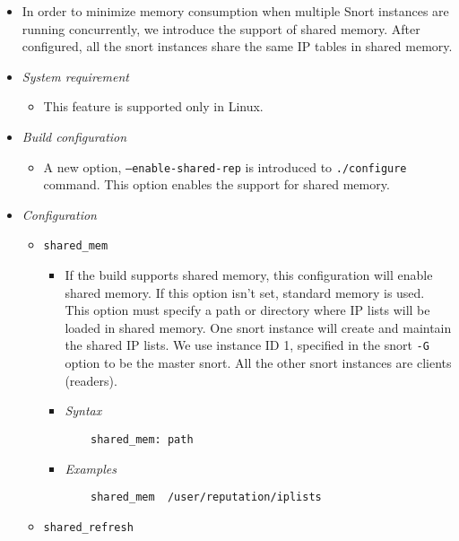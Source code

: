 \documentclass[english]{report}
\begin{document}
\begin{itemize}
 \item[]
  In order to minimize memory consumption when multiple Snort instances are 
  running concurrently, we introduce the support of shared memory. After 
  configured, all the snort instances share the same IP tables in shared memory. 

 \item[]\textit{System requirement}
\begin{itemize}
  \item[]This feature is supported only in Linux.
\end{itemize}  

 \item[]\textit{Build configuration}

 \begin{itemize} \item[]A new option, \texttt{--enable-shared-rep} is introduced to 
   \texttt{./configure} command. 
    This option enables the support for shared memory.
\end{itemize}
 \item[]\textit{Configuration}

\begin{itemize}
  
 \item[]\texttt{shared\_mem}
\begin{itemize}
 
 \item[] If the build supports shared memory, this configuration will enable shared 
  memory. If this option isn't set, standard memory is used.  This option must 
  specify a path or directory where IP lists will be loaded in shared memory. 
  One snort instance will create and maintain the shared IP lists. 
  We use instance ID 1, specified in the snort \texttt{-G} option to be the master snort.
  All the other snort instances are clients (readers). 
 
  \item[] \textit{Syntax}
   \begin{verbatim}
    shared_mem: path
   \end{verbatim}
  \item[] \textit{Examples}  
   \begin{verbatim}          
    shared_mem  /user/reputation/iplists
   \end{verbatim}
\end{itemize}
 \item[]\texttt{shared\_refresh}


\end{itemize}
\end{itemize}
\end{document}
